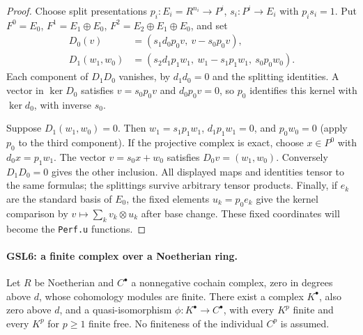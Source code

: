 \documentclass[11pt,a4paper]{article}
\numberwithin{equation}{section}
\theoremstyle{remark}\newtheorem{remark}[theorem]{Remark}
\begin{document}
\begin{proof}
Choose split presentations
$p_i:E_i=R^{n_i}\to P^i$, $s_i:P^i\to E_i$ with $p_is_i=1$.
Put $F^0=E_0$, $F^1=E_1\oplus E_0$,
$F^2=E_2\oplus E_1\oplus E_0$, and set
\begin{align*}
 D_0(v)&=(s_1d_0p_0v,\ v-s_0p_0v),\\
 D_1(w_1,w_0)&=(s_2d_1p_1w_1,\ w_1-s_1p_1w_1,\ s_0p_0w_0).
\end{align*}
Each component of $D_1D_0$ vanishes, by $d_1d_0=0$ and the
splitting identities.  A vector in $\ker D_0$ satisfies
$v=s_0p_0v$ and $d_0p_0v=0$, so $p_0$ identifies this kernel with
$\ker d_0$, with inverse $s_0$.

Suppose $D_1(w_1,w_0)=0$.  Then $w_1=s_1p_1w_1$,
$d_1p_1w_1=0$, and $p_0w_0=0$ (apply $p_0$ to the third
component).  If the projective complex is exact, choose $x\in P^0$
with $d_0x=p_1w_1$.  The vector $v=s_0x+w_0$ satisfies
$D_0v=(w_1,w_0)$.  Conversely $D_1D_0=0$ gives the other inclusion.
All displayed maps and identities tensor to the same formulas; the
splittings survive arbitrary tensor products.  Finally, if $e_k$ are
the standard basis of $E_0$, the fixed elements $u_k=p_0e_k$
give the kernel comparison by
$v\mapsto\sum_kv_k\otimes u_k$ after base change.  These fixed
coordinates will become the \texttt{Perf.\allowbreak u} functions.
\end{proof}

\paragraph{GSL6: a finite complex over a Noetherian ring.}
\label{claim:GSL6}
Let $R$ be Noetherian and $C^\bullet$ a nonnegative cochain complex,
zero in degrees above $d$, whose cohomology modules are finite.
There exist a complex $K^\bullet$, also zero above $d$, and a
quasi-isomorphism $\phi:K^\bullet\to C^\bullet$, with every $K^p$
finite and every $K^p$ for $p\ge1$ finite free.  No finiteness of the
individual $C^p$ is assumed.
\end{document}
